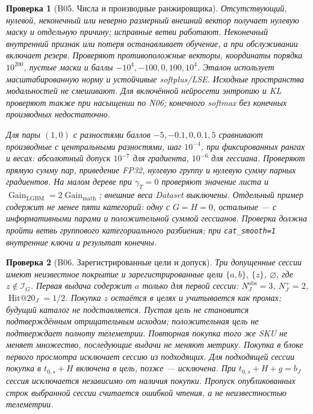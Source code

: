 \documentclass[12pt,a4paper]{article}
\newcommand{\code}[1]{{\ttfamily\small\nolinkurl{#1}}}
\theoremstyle{plainru}
\newtheorem{testcase}{Проверка}[section]
\begin{document}
\begin{testcase}[B05. Числа и производные ранжировщика]
Отсутствующий, нулевой, неконечный или неверно размерный внешний
вектор получает нулевую маску и отдельную причину; исправные ветви работают.
Неконечный внутренний признак или потеря останавливает обучение,
а при обслуживании включает резерв. Проверяют противоположные
векторы, координаты порядка $10^{200}$, пустые маски и баллы
$-10^4,-100,0,100,10^4$. Эталон использует масштабированную норму
и устойчивые softplus/LSE. Исходные пространства модальностей не смешивают.
Для включённой нейросети энтропию и KL проверяют также при насыщении
по N06; конечного softmax без конечных производных недостаточно.

Для пары $(1,0)$ с разностями баллов $-5,-0.1,0,0.1,5$
сравнивают производные с центральными разностями, шаг $10^{-4}$,
при фиксированных рангах и весах: абсолютный допуск $10^{-7}$
для градиента, $10^{-6}$ для гессиана. Проверяют прямую сумму пар,
приведение FP32, нулевую группу и нулевую сумму парных градиентов.
На малом дереве при $\gamma_T=0$ проверяют значение листа и
$\operatorname{Gain}_{\mathrm{LGBM}}=2\operatorname{Gain}_{\mathrm{math}}$;
внешние веса Dataset выключены.
Отдельный пример содержит не менее пяти категорий: одну с $G=H=0$,
остальные --- с информативными парами и положительной суммой гессианов.
Проверка должна пройти ветвь группового категориального разбиения;
при \code{cat_smooth=1} внутренние ключи и результат конечны.
\end{testcase}

\begin{testcase}[B06. Зарегистрированные цели и допуск]
Три допущенные сессии имеют
неизвестное покрытие и зарегистрированные цели $\{a,b\}$, $\{z\}$,
$\varnothing$, где $z\notin\mathcal I_G$.
Первая выдача содержит $a$ только для первой сессии:
$N_J^{\mathrm{obs}}=3$, $N_J^+=2$,
$\operatorname{Hit@20}_J=1/2$.
Покупка $z$ остаётся в целях и учитывается как промах;
будущий каталог не подставляется.
Пустая цель не становится подтверждённым отрицательным исходом;
положительная цель не подтверждает полноту телеметрии.
Повторная покупка того же SKU не меняет множество, последующие выдачи
не меняют метрику. Покупка в блоке первого просмотра исключает сессию
из подходящих. Для подходящей сессии покупка в $t_{0,s}+H$
включена в цель, позже --- исключена. При $t_{0,s}+H+g=b_J$ сессия исключается
независимо от наличия покупки. Пропуск опубликованных строк выбранной
сессии считается ошибкой чтения, а не неизвестностью телеметрии.
\end{testcase}
\end{document}
